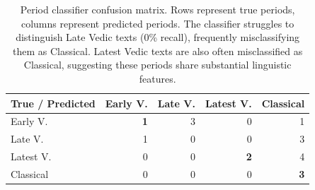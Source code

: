 \begin{table}[ht]
\centering
\caption{Period classifier confusion matrix. Rows represent true periods, columns represent predicted periods. The classifier struggles to distinguish Late Vedic texts (0\% recall), frequently misclassifying them as Classical. Latest Vedic texts are also often misclassified as Classical, suggesting these periods share substantial linguistic features.}
\label{tab:period-confusion}
\begin{tabular}{lrrrr}
\toprule
\textbf{True / Predicted} & \textbf{Early V.} & \textbf{Late V.} & \textbf{Latest V.} & \textbf{Classical} \\
\midrule
Early V. & \textbf{1} & 3 & 0 & 1 \\
Late V. & 1 & 0 & 0 & 3 \\
Latest V. & 0 & 0 & \textbf{2} & 4 \\
Classical & 0 & 0 & 0 & \textbf{3} \\
\bottomrule
\end{tabular}
\end{table}